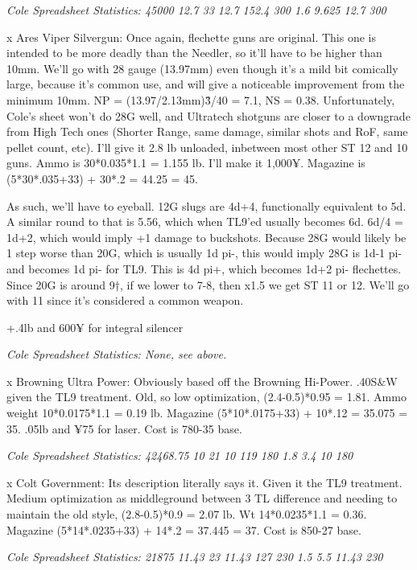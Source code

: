 \begin{multicols*}{2}
	\textit{\textcolor{OliveGreen}{Cole Spreadsheet Statistics: 45000 12.7 33 12.7 152.4 300 1.6 9.625 12.7 300}}
	
	x Ares Viper Silvergun: Once again, flechette guns are original. This one is intended to be more deadly than the Needler, so it'll have to be higher than 10mm. We'll go with 28 gauge (13.97mm) even though it's a mild bit comically large, because it's common use, and will give a noticeable improvement from the minimum 10mm. NP = (13.97/2.13mm)\^3/40 = 7.1, NS = 0.38. Unfortunately, Cole's sheet won't do 28G well, and Ultratech shotguns are closer to a downgrade from High Tech ones (Shorter Range, same damage, similar shots and RoF, same pellet count, etc). I'll give it 2.8 lb unloaded, inbetween most other ST 12 and 10 guns. Ammo is 30*0.035*1.1 = 1.155 lb. I'll make it 1,000¥. Magazine is (5*30*.035+33) + 30*.2 = 44.25 = 45.
	
	As such, we'll have to eyeball. 12G slugs are 4d+4, functionally equivalent to 5d. A similar round to that is 5.56, which when TL9'ed usually becomes 6d. 6d/4 = 1d+2, which would imply +1 damage to buckshots. Because 28G would likely be 1 step worse than 20G, which is usually 1d pi-, this would imply 28G is 1d-1 pi- and becomes 1d pi- for TL9. This is 4d pi+, which becomes 1d+2 pi- flechettes. Since 20G is around 9†, if we lower to 7-8, then x1.5 we get ST 11 or 12. We'll go with 11 since it's considered a common weapon.
	
	+.4lb and 600¥ for integral silencer
	
	\textit{\textcolor{OliveGreen}{Cole Spreadsheet Statistics: None, see above.}}
	
	x Browning Ultra Power: Obviously based off the Browning Hi-Power. .40S\&W given the TL9 treatment. Old, so low optimization, (2.4-0.5)*0.95 = 1.81. Ammo weight 10*0.0175*1.1 = 0.19 lb. Magazine (5*10*.0175+33) + 10*.12 = 35.075 = 35. .05lb and ¥75 for laser. Cost is 780-35 base.
	
	\textit{\textcolor{OliveGreen}{Cole Spreadsheet Statistics: 42468.75 10 21 10 119 180 1.8 3.4 10 180}}
	
	x Colt Government: Its description literally says it. Given it the TL9 treatment. Medium optimization as middleground between 3 TL difference and needing to maintain the old style, (2.8-0.5)*0.9 = 2.07 lb. Wt 14*0.0235*1.1 = 0.36. Magazine (5*14*.0235+33) + 14*.2 = 37.445 = 37. Cost is 850-27 base.
	
	\textit{\textcolor{OliveGreen}{Cole Spreadsheet Statistics: 21875 11.43 23 11.43 127 230 1.5 5.5 11.43 230}}
	

\end{multicols*}
